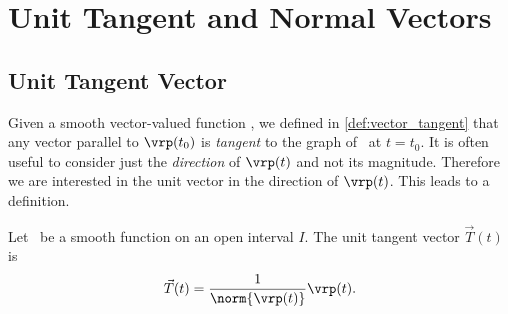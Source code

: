 \section{Unit Tangent and Normal Vectors}\label{sec:tan_norm}

\subsection{Unit Tangent Vector}

Given a smooth vector-valued function \vrt, we defined in \autoref{def:vector_tangent} that any vector parallel to $\vrp(t_0)$ is \emph{tangent} to the graph of \vrt\ at $t=t_0$. It is often useful to consider just the \emph{direction} of $\vrp(t)$ and not its magnitude. Therefore we are interested in the unit vector in the direction of $\vrp(t)$. This leads to a definition.

\begin{definition}\label{def:unit_tangent}
Let \vrt\ be a smooth function on an open interval $I$. The unit tangent vector $\vec T(t)$ is
 
\[\vec T(t) = \frac1{\norm{\vrp(t)}}\vrp(t).\]
\end{definition}


